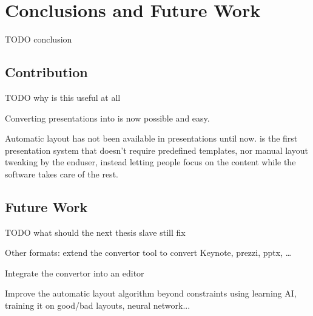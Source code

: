 
 \chapter{Conclusions and Future Work}

  TODO conclusion

  \section{Contribution}

   TODO why is this useful at all

   Converting \ppt presentations into \mxp is now possible and easy.

   Automatic layout has not been available in presentations until now. \mxp is
   the first presentation system that doesn't require predefined templates, nor
   manual layout tweaking by the enduser, instead letting people focus on the
   content while the software takes care of the rest.

  \section{Future Work}

   TODO what should the next thesis slave still fix

   Other formats: extend the convertor tool to convert Keynote, prezzi, pptx,
   \ldots

   Integrate the convertor into an \mxp editor

   Improve the automatic layout algorithm beyond constraints using learning AI,
   training it on good/bad layouts, neural network...

